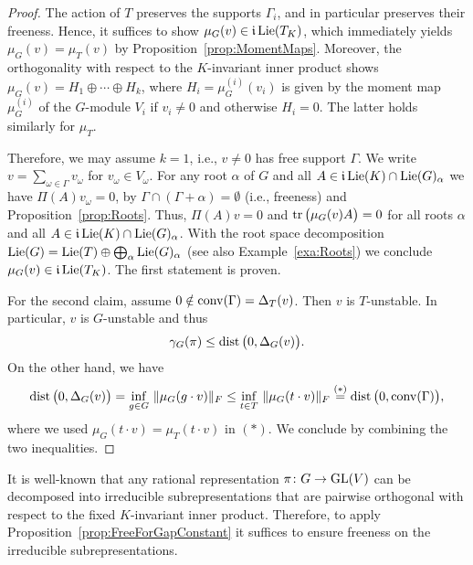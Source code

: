 \begin{proof}
	The action of $T$ preserves the supports $\Gamma_i$, and in particular preserves their freeness. Hence, it suffices to show $\mu_G(v) \in \mathfrak{i}\operatorname{Lie}(T_K)$, which immediately yields $\mu_G(v) = \mu_{T}(v)$ by Proposition~\ref{prop:MomentMaps}. Moreover, the orthogonality with respect to the $K$-invariant inner product shows $\mu_G(v) = H_1 \oplus \cdots \oplus H_k$, where $H_i = \mu_G^{(i)}(v_i)$ is given by the moment map $\mu_G^{(i)}$ of the $G$-module $V_i$ if $v_i \neq 0$ and otherwise $H_i = 0$. The latter holds similarly for $\mu_{T}$.
	
	Therefore, we may assume $k=1$, i.e., $v \neq 0$ has free support $\Gamma$. We write $v = \sum_{\omega \in \Gamma} v_\omega$ for $v_\omega \in V_\omega$. For any root $\alpha$ of $G$ and all $A \in \mathfrak{i} \operatorname{Lie}(K) \cap \operatorname{Lie}(G)_\alpha$ we have $\Pi(A) v_\omega = 0$, by $\Gamma \cap (\Gamma + \alpha) = \emptyset$ (i.e., freeness) and Proposition~\ref{prop:Roots}. Thus, $\Pi(A)v = 0$ and $\operatorname{tr} \big( \mu_G(v)A \big) = 0$ for all roots $\alpha$ and all $A \in \mathfrak{i} \operatorname{Lie}(K) \cap \operatorname{Lie}(G)_\alpha$. With the root space decomposition $\operatorname{Lie}(G) = \operatorname{Lie}(T) \oplus \bigoplus_\alpha \operatorname{Lie}(G)_\alpha$ (see also Example~\ref{exa:Roots}) we conclude $\mu_G(v) \in \mathfrak{i} \operatorname{Lie}(T_K)$. The first statement is proven.
	
	For the second claim, assume $0 \notin \operatorname{conv}(\Gamma) = \Delta_{T}(v)$. Then $v$ is $T$-unstable. In particular, $v$ is $G$-unstable and thus
	\[ \gamma_G(\pi) \leq \operatorname{dist} \big( 0, \Delta_G(v) \big) . \]
	On the other hand, we have
	\begin{align*}
		\operatorname{dist} \big( 0, \Delta_G(v) \big) = \inf_{g \in G} \, \| \mu_G(g \cdot v) \|_F
		\leq \inf_{t \in T} \, \| \mu_G(t \cdot v) \|_F \overset{(*)}{=} \operatorname{dist} \big( 0, \operatorname{conv}(\Gamma) \big) ,
	\end{align*}
	where we used $\mu_G(t \cdot v) = \mu_{T}(t \cdot v)$ in $(*)$. We conclude by combining the two inequalities.
\end{proof}

\begin{remark}
	It is well-known that any rational representation $\pi \colon G \to \operatorname{GL}(V)$ can be decomposed into irreducible subrepresentations that are pairwise orthogonal with respect to the fixed $K$-invariant inner product. Therefore, to apply Proposition~\ref{prop:FreeForGapConstant} it suffices to ensure freeness on the irreducible subrepresentations.
	\hfill\remSymbol
\end{remark}

